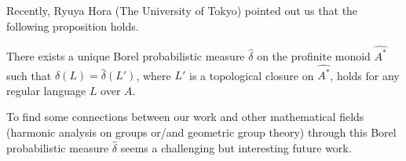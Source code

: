 Recently, Ryuya Hora (The University of Tokyo) pointed out us that the following proposition holds.
\begin{proposition}\label{hora}
There exists a unique Borel probabilistic measure \(\widehat{\delta}\) on the profinite monoid \(\widehat{A^*}\) such that \(\delta(L) = \widehat{\delta}(L')\), where \(L'\) is a topological closure on \(\widehat{A^*}\), holds for any regular language \(L\) over \(A\).
\end{proposition}
To find some connections between our work and other mathematical fields (\eg harmonic analysis on groups or/and geometric group theory) through this Borel probabilistic measure \(\widehat{\delta}\) seems a challenging but interesting future work.
